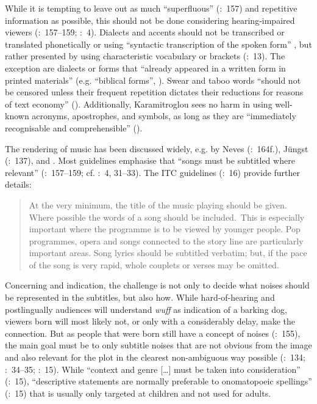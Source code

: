 \largerpage
While it is tempting to leave out as much “superfluous” (\citealt{Ivarsson1998}:~157) and repetitive information as possible, this should not be done considering hearing-impaired viewers (\citealt{Ivarsson1998}:~157--159; \citealt{Ford_williams2009}:~4). Dialects and accents should not be transcribed or translated phonetically or using “syntactic transcription of the spoken form” \citep{Karamitroglou1998}, but rather presented by using characteristic vocabulary or brackets (\citealt{De_linde1999}:~13). The exception are dialects or forms that “already appeared in a written form in printed materials” (e.g. “biblical forms”, \citealt{Karamitroglou1998}). Swear and taboo words “should not be censored unless their frequent repetition dictates their reductions for reasons of text economy” (\citealt{Karamitroglou1998}). Additionally, Karamitroglou sees no harm in using well-known acronyms, apostrophes, and symbols, as long as they are “immediately recognisable and comprehensible” (\citealt{Karamitroglou1998}).

The rendering of music has been discussed widely, e.g. by Neves (\citeyear{neves2009}:~164f.), Jüngst (\citeyear{Jungst2010}:~137), and \citet{Krammer2001}. Most guidelines emphasise that “songs must be subtitled where relevant” (\citealt{Ivarsson1998}:~157--159; cf. \citealt{Ford_williams2009}:~4, 31--33). The ITC guidelines (\citeyear{Itc1999}:~16) provide further details:
\begin{quote}
At the very minimum, the title of the music playing should be given. Where possible the words of a song should be included.~This is especially important where the programme is to be viewed by younger people. Pop programmes, opera and songs connected to the story line are particularly important areas. Song lyrics should be subtitled verbatim; but, if the pace of the song is very rapid, whole couplets or verses may be omitted.
\end{quote}
Concerning  and indication, the challenge is not only to decide what noises should be represented in the subtitles, but also how. While hard-of-hearing and postlingually  audiences will understand \textit{wuff} as indication of a barking dog, viewers born  will most likely not, or only with a considerably delay, make the connection. But as people that were born  still have a concept of noises (\citealt{neves2009}:~155), the main goal must be to only subtitle noises that are not obvious from the image and also relevant for the plot in the clearest non-ambiguous way possible (\citealt{Jungst2010}:~134; \citealt{Ford_williams2009}:~34--35; \citealt{Itc1999}:~15). While “context and genre […] must be taken into consideration” (\citealt{Itc1999}:~15), “descriptive statements are normally preferable to onomatopoeic spellings” (\citealt{Itc1999}:~15) that is usually only targeted at children and not used for adults.


